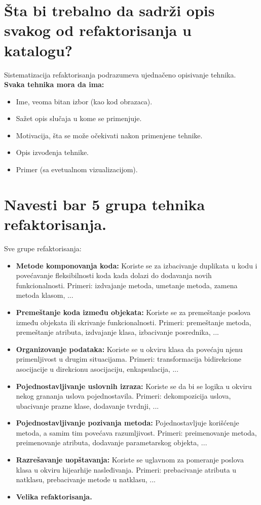\documentclass[a4paper]{article}
\begin{document}
\section{Šta bi trebalno da sadrži opis svakog od refaktorisanja u katalogu?}
  Sistematizacija refaktorisanja podrazumeva ujednačeno opisivanje tehnika.\\
  \textbf{Svaka tehnika mora da ima:}
  \begin{itemize}
    \item Ime, veoma bitan izbor (kao kod obrazaca).
    \item Sažet opis slučaja u kome se primenjuje.
    \item Motivacija, šta se može očekivati nakon primenjene tehnike.
    \item Opis izvođenja tehnike.
    \item Primer (sa evetualnom vizualizacijom).
  \end{itemize}  

\section{Navesti bar 5 grupa tehnika refaktorisanja.}
  Sve grupe refaktorisanja:
  \begin{itemize}
    \item \textbf{Metode komponovanja koda:} Koriste se za izbacivanje duplikata u kodu i
          povećavanje fleksibilnosti koda kada dolazi do dodavanja novih funkcionalnosti.
          Primeri: izdvajanje metoda, umetanje metoda, zamena metoda klasom, ... 
    \item \textbf{Premeštanje koda između objekata:} Koriste se za premeštanje poslova
          između objekata ili skrivanje funkcionalnosti. Primeri: premeštanje metoda,
          premeštanje atributa, izdvajanje klasa, izbacivanje posrednika, ...
    \item \textbf{Organizovanje podataka:} Koriste se u okviru klasa da povećaju njenu
          primenljivost u drugim situacijama. Primeri: transformacija bidirekcione
          asocijacije u direkcionu asocijaciju, enkapsulacija, ...
    \item \textbf{Pojednostavljivanje uslovnih izraza:} Koriste se da bi se logika u okviru
          nekog grananja uslova pojednostavila. Primeri: dekompozicija uslova, ubacivanje 
          prazne klase, dodavanje tvrdnji, ...
    \item \textbf{Pojednostavljivanje pozivanja metoda:} Pojednostavljuje korišćenje metoda, a 
          samim tim povećava razumljivost. Primeri: preimenovanje metoda, preimenovanje 
          atributa, dodavanje parametarskog objekta, ... 
    \item \textbf{Razrešavanje uopštavanja:} Koriste se uglavnom za pomeranje poslova klasa
          u okviru hijearhije nasleđivanja. Primeri: prebacivanje atributa u natklasu,
          prebacivanje metode u natklasu, ...
    \item \textbf{Velika refaktorisanja.}
  \end{itemize}
\end{document}
